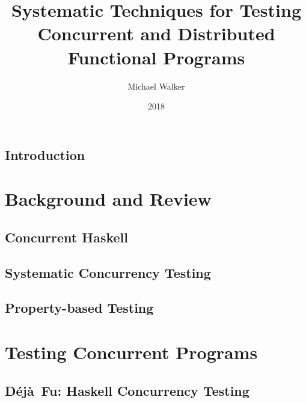 \documentclass[openright,imperial,11pt]{octavo}
\title{Systematic Techniques for Testing Concurrent and Distributed Functional Programs}
\author{Michael Walker}
\date{\todo{MONTH} 2018}
\newcommand{\dejafu}{D\'{e}j\`{a}~Fu}
\begin{document}
\frontmatter

\pagestyle{plain}

\makeatletter\@openrightfalse\makeatother



\cleardoublepage

\mainmatter

\makeatletter\@openrighttrue\makeatother

\pagestyle{headings}

\chapter{Introduction}
\label{chp:introduction}


\part{Background and Review}
\label{part:review}

\chapter{Concurrent Haskell}
\label{chp:concurrent_haskell}


\chapter{Systematic Concurrency Testing}
\label{chp:sct}


\chapter{Property-based Testing}
\label{chp:property_testing}


\part{Testing Concurrent Programs}
\label{part:testing}

\chapter{\dejafu{}: Haskell Concurrency Testing}
\label{chp:dejafu}

\end{document}
